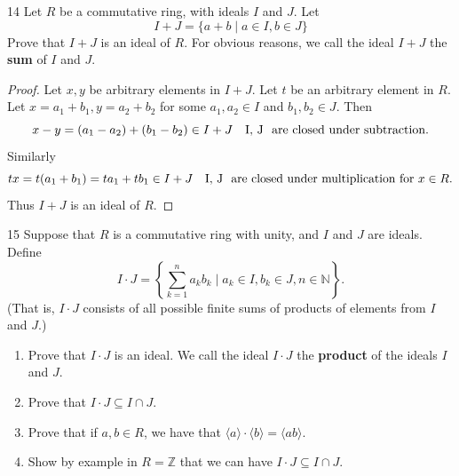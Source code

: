 \begin{problem}{14}
    Let $R$ be a commutative ring, with ideals $I$ and $J$.
    Let 
    \[I + J = \{a + b \mid a \in I, b \in J\}\]
    Prove that $I + J$ is an ideal of $R$.
    For obvious reasons, we call the ideal $I + J$ the \textbf{sum}
    of $I$ and $J$.
\end{problem}
\solved

\begin{proof}
    Let $x, y$ be arbitrary elements in $I + J$.
    Let $t$ be an arbitrary element in $R$.
    Let $x = a_1 + b_1, y = a_2 + b_2$ for some $a_1, a_2 \in I$ and $b_1, b_2 \in J$.
    Then 
    \[x - y = (a_1 - a_2) + (b_1 - b_2) \in I + J \quad \text{I, J \text{ are closed under subtraction.}}\]
    Similarly 
    \[tx = t(a_1 + b_1) = ta_1 + tb_1 \in I + J \quad \text{I, J \text{ are closed under multiplication for $x \in R$.}}\]
    Thus $I + J$ is an ideal of $R$.
\end{proof}

\begin{problem}{15}
    Suppose that $R$ is a commutative ring with unity, and $I$ and $J$
    are ideals. Define 
    \[I \cdot J = \left\{\sum_{k = 1}^{n} a_k b_k \mid a_k \in I, b_k \in J, n \in \mathbb{N}\right\}.\]
    (That is, $I \cdot J$ consists of all possible finite sums of products of elements from $I$ and $J$.)
    \begin{enumerate}
        \item Prove that $I \cdot J$ is an ideal. We call the ideal $I \cdot J$ the \textbf{product} of the ideals $I$ and $J$.
        \item Prove that $I \cdot J \subseteq I \cap J$.
        \item Prove that if $a, b \in R$, we have that $\langle a \rangle \cdot \langle b \rangle = \langle ab \rangle$.
        \item Show by example in $R = \mathbb{Z}$ that we can have $I \cdot J \subseteq I \cap J$.
    \end{enumerate}
\end{problem}
\solved


